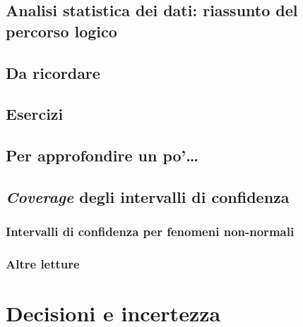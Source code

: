 \documentclass[a4paper,12pt,oneside]{book}
\begin{document}
\hypertarget{analisi-statistica-dei-dati-riassunto-del-percorso-logico}{%
\section{Analisi statistica dei dati: riassunto del percorso logico}\label{analisi-statistica-dei-dati-riassunto-del-percorso-logico}}

\hypertarget{da-ricordare}{%
\section{Da ricordare}\label{da-ricordare}}

\hypertarget{esercizi}{%
\section{Esercizi}\label{esercizi}}

\hypertarget{per-approfondire-un-po-3}{%
\section{Per approfondire un po'\ldots{}}\label{per-approfondire-un-po-3}}

\hypertarget{coverage-degli-intervalli-di-confidenza}{%
\section{\texorpdfstring{\emph{Coverage} degli intervalli di confidenza}{Coverage degli intervalli di confidenza}}\label{coverage-degli-intervalli-di-confidenza}}

\hypertarget{intervalli-di-confidenza-per-fenomeni-non-normali}{%
\subsection{Intervalli di confidenza per fenomeni non-normali}\label{intervalli-di-confidenza-per-fenomeni-non-normali}}

\hypertarget{altre-letture-1}{%
\subsection{Altre letture}\label{altre-letture-1}}

\hypertarget{decisioni-e-incertezza}{%
\chapter{Decisioni e incertezza}\label{decisioni-e-incertezza}}
\end{document}
